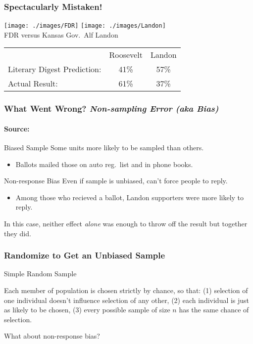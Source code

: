 \documentclass[handout]{beamer}
\begin{document}
\begin{frame}
\frametitle{Spectacularly Mistaken!}

\begin{center}
\texttt{[image: ./images/FDR]}
\texttt{[image: ./images/Landon]}\\
\small FDR versus Kansas Gov.\ Alf Landon
\end{center}

\normalsize

\begin{table}
\begin{tabular}{lcc}
&Roosevelt&Landon\\
Literary Digest Prediction: &41\% & \alert{57\%}\\
Actual Result: &\alert{61\%} & 37\%

\end{tabular}

\end{table}

\end{frame}
\begin{frame}

\frametitle{What Went Wrong? \emph{Non-sampling Error (aka Bias)}}
\framesubtitle{Source: \href{http://www.jstor.org/stable/10.2307/2749114}{}}

\begin{block}{Biased Sample}
Some units more likely to be sampled than others.
	\begin{itemize}
		\item Ballots mailed those on auto reg.\ list and in phone books.
	\end{itemize}
\end{block}

\begin{block}{Non-response Bias}
Even if sample is unbiased, can't force people to reply.
	\begin{itemize}
		\item Among those who recieved a ballot, Landon supporters were more likely to reply.
	\end{itemize}
\end{block}
\alert{In this case, neither effect \emph{alone} was enough to throw off the result but together they did.}
\end{frame}
\begin{frame}
\frametitle{Randomize to Get an Unbiased Sample}

\begin{block}{Simple Random Sample}

Each member of population is chosen strictly by chance, so that: (1) selection of one individual doesn't influence selection of any other, (2) each individual is just as likely to be chosen, (3) every possible sample of size $n$ has the same chance of selection.

\end{block}

\begin{block}{What about non-response bias?}
\end{block}
\end{frame}
\end{document}
